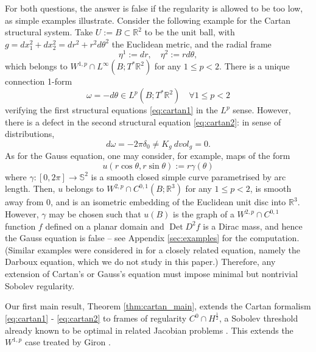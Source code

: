 \documentclass[12pt]{article}
\newcommand{\R}{\mathbb{R}}
\newcommand{\Det}{\operatorname{Det}}
\theoremstyle{plain}
\numberwithin{equation}{section}
\begin{document}
For both questions, the answer is false if the regularity is allowed to be too low, as simple examples illustrate. Consider the following example for the Cartan structural system. Take $U := B \subset \R^2$ to be the unit ball, with $g = dx_1^2 + dx_2^2 = dr^2 + r^2 d\theta^2$ the Euclidean metric, and the radial frame
\begin{equation*}
    \eta^1 := dr, \quad \eta^2 := rd\theta,
\end{equation*}
which belongs to $W^{1,p} \cap L^\infty(B;T^*\R^2)$ for any $1 \leq p < 2$. There is a unique connection 1-form
\begin{equation*}
    \omega = -d\theta \in L^p(B; T^* \R^2)\quad \forall 1\leq p < 2
\end{equation*}
verifying the first structural equations \eqref{eq:cartan1} in the $L^p$ sense. However, there is a defect in the second structural equation \eqref{eq:cartan2}: in sense of distributions,
\begin{equation*}
    d\omega = -2\pi \delta_0 \neq K_g ~dvol_g = 0.
\end{equation*}
As for the Gauss equation, one may consider, for example, maps of the form
\begin{equation} \label{eq:liu_maly_cone}
    u(r\cos\theta, r\sin\theta) := r\gamma(\theta)
\end{equation}
where $\gamma : [0,2\pi] \to \mathbb{S}^2$ is a smooth closed simple curve parametrised by arc length. Then, $u$ belongs to $W^{2,p} \cap C^{0,1}(B;\R^3)$ for any $1 \leq p < 2$, is smooth away from $0$, and is an isometric embedding of the Euclidean unit disc into $\R^3$. However, $\gamma$ may be chosen such that $u(B)$ is the graph of a $W^{2,p} \cap C^{0,1}$ function $f$ defined on a planar domain and $\Det D^2 f$ is a Dirac mass, and hence the Gauss equation is false -- see Appendix \ref{sec:examples} for the computation. (Similar examples were considered in \cite{liu_maly} for a closely related equation, namely the Darboux equation, which we do not study in this paper.) Therefore, any extension of Cartan's or Gauss's equation must impose minimal but nontrivial Sobolev regularity.

Our first main result, Theorem \ref{thm:cartan_main}, extends the Cartan formalism \eqref{eq:cartan1} - \eqref{eq:cartan2} to frames of regularity $C^0 \cap H^{\frac12}$, a Sobolev threshold already known to be optimal in related Jacobian problems \cite{brezis_nguyen_11}. This extends the $W^{1,p}$ case treated by Giron \cite{giron_21}.
\end{document}
